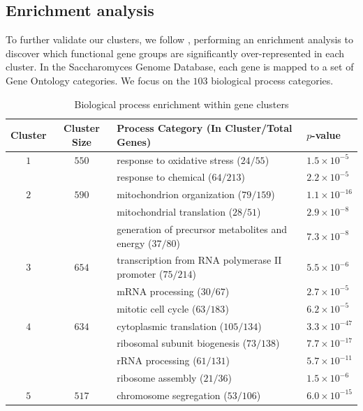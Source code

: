 \documentclass[12pt]{article}
\begin{document}
\subsection{Enrichment analysis}

To further validate our clusters, we follow \citet{tavazoie1999systematic},
performing an enrichment analysis to discover which functional gene groups are
significantly over-represented in each cluster. In the Saccharomyces Genome
Database, each gene is mapped to a set of Gene Ontology categories. We focus
on the $103$ biological process categories.



\begin{table}
\begin{center}
\captionsetup{justification=centering}
\caption{\label{table:enrich} Biological process enrichment within gene clusters}
\footnotesize
\begin{tabular}{ccll}
\toprule
Cluster & Cluster Size & Process Category (In Cluster/Total Genes) & $p$-value \\
\midrule
$1$ & $550$ & response to oxidative stress ($24/55$)  & $1.5\times10^{-5}$  \\
    &       & response to chemical ($64/213$)         & $2.2\times10^{-5}$  \\
$2$ & $590$ & mitochondrion organization ($79/159$)   & $1.1\times10^{-16}$ \\
    &       & mitochondrial translation ($28/51$)     & $2.9\times10^{-8}$  \\
    &       & generation of precursor metabolites and energy ($37/80$) & $7.3\times10^{-8}$ \\
$3$ & $654$ & transcription from RNA polymerase II promoter ($75/214$) & $5.5\times10^{-6}$ \\
    &       & mRNA processing ($30/67$)               & $2.7\times10^{-5}$  \\
    &       & mitotic cell cycle ($63/183$)           & $6.2\times10^{-5}$  \\
$4$ & $634$ & cytoplasmic translation ($105/134$)     & $3.3\times10^{-47}$ \\
    &       & ribosomal subunit biogenesis ($73/138$) & $7.7\times10^{-17}$ \\
    &       & rRNA processing ($61/131$)              & $5.7\times10^{-11}$ \\
    &       & ribosome assembly ($21/36$)             & $1.5\times10^{-6}$  \\
$5$ & $517$ & chromosome segregation ($53/106$)       & $6.0\times10^{-15}$ \\

\end{tabular}
\end{center}
\end{table}
\end{document}
